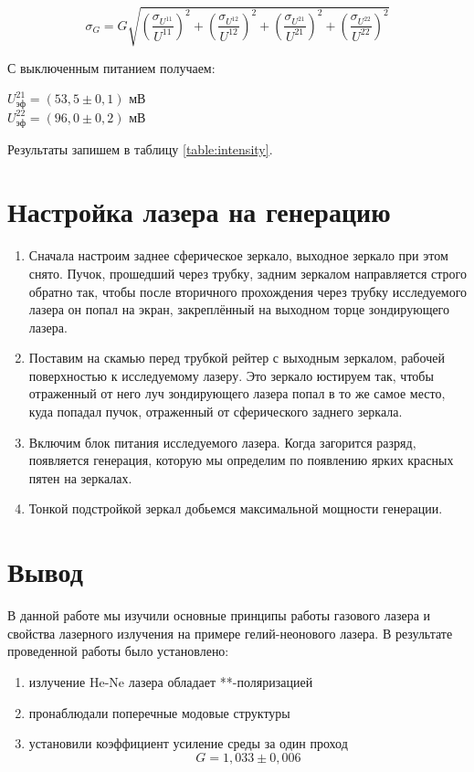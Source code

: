     \[ \sigma_G = G \sqrt{\left(\frac{\sigma_{U^{11}}}{U^{11}} \right)^2 + \left(\frac{\sigma_{U^{12}}}{U^{12}} \right)^2 + \left(\frac{\sigma_{U^{21}}}{U^{21}} \right)^2 + \left(\frac{\sigma_{U^{22}}}{U^{22}} \right)^2} \]
    
    С выключенным питанием получаем:
    \begin{center}
    	$U_{\text{эф}}^{21} = (53,5 \pm 0,1)$ мВ \\
    	$U_{\text{эф}}^{22} = (96,0 \pm 0,2)$ мВ
    \end{center}
    
    Результаты запишем в таблицу \ref{table:intensity}.

    
    
    \section*{Настройка лазера на генерацию}
    
    \begin{enumerate}
    	\item Сначала настроим заднее сферическое зеркало, выходное зеркало при этом снято. Пучок, прошедший через трубку, задним зеркалом направляется строго обратно так, чтобы после вторичного прохождения через трубку исследуемого лазера он попал на экран, закреплённый на выходном торце зондирующего лазера.
    	
    	\item Поставим на скамью перед трубкой рейтер с выходным зеркалом, рабочей поверхностью к исследуемому лазеру. Это зеркало юстируем так, чтобы отраженный от него луч зондирующего лазера попал в то же самое место, куда попадал пучок, отраженный от сферического заднего зеркала.
    	
    	\item Включим блок питания исследуемого лазера. Когда загорится разряд, появляется генерация, которую мы определим по появлению ярких красных пятен на зеркалах.
    	
    	\item Тонкой подстройкой зеркал добьемся максимальной мощности генерации.
    \end{enumerate}
    
    \section*{Вывод}
    
    В данной работе мы изучили основные принципы работы газового лазера и свойства лазерного излучения на примере гелий-неонового лазера. В результате проведенной работы было установлено:
    
    \begin{enumerate}
    	\item излучение He-Ne лазера обладает **-поляризацией
    	\item пронаблюдали поперечные модовые структуры
    	\item установили коэффициент усиление среды за один проход $$G = 1,033 \pm 0,006$$
    \end{enumerate}
    
